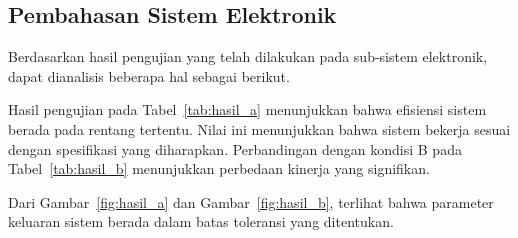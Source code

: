 
\subsection{Pembahasan Sistem Elektronik}

Berdasarkan hasil pengujian yang telah dilakukan pada sub-sistem elektronik, dapat dianalisis beberapa hal sebagai berikut.

Hasil pengujian pada Tabel~\ref{tab:hasil_a} menunjukkan bahwa efisiensi sistem berada pada rentang tertentu. Nilai ini menunjukkan bahwa sistem bekerja sesuai dengan spesifikasi yang diharapkan. Perbandingan dengan kondisi B pada Tabel~\ref{tab:hasil_b} menunjukkan perbedaan kinerja yang signifikan.

Dari Gambar~\ref{fig:hasil_a} dan Gambar~\ref{fig:hasil_b}, terlihat bahwa parameter keluaran sistem berada dalam batas toleransi yang ditentukan.
